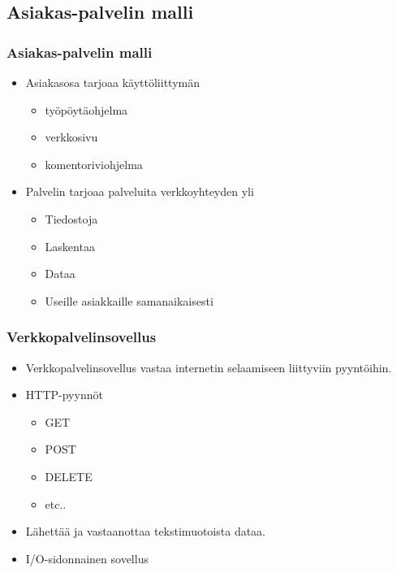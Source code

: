 \documentclass{beamer}
\begin{document}
\subsection{Asiakas-palvelin malli}
\begin{frame}
  \frametitle{Asiakas-palvelin malli}
  \begin{itemize}
    \item Asiakasosa tarjoaa käyttöliittymän
      \begin{itemize}
        \item työpöytäohjelma
        \item verkkosivu
        \item komentoriviohjelma
      \end{itemize}
    \item Palvelin tarjoaa palveluita verkkoyhteyden yli
      \begin{itemize}
        \item Tiedostoja
        \item Laskentaa
        \item Dataa
        \item Useille asiakkaille samanaikaisesti
      \end{itemize}
  \end{itemize}
\end{frame}
\begin{frame}
  \frametitle{Verkkopalvelinsovellus}
  \begin{itemize}
    \item Verkkopalvelinsovellus vastaa internetin selaamiseen liittyviin pyyntöihin.
    \item HTTP-pyynnöt
      \begin{itemize}
        \item GET
        \item POST
        \item DELETE
        \item etc..
      \end{itemize}
    \item Lähettää ja vastaanottaa tekstimuotoista dataa.
    \item I/O-sidonnainen sovellus
  \end{itemize}
\end{frame}
\end{document}
